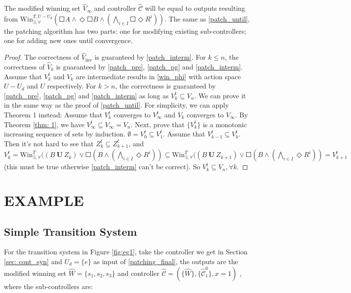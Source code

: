 The modified winning set $ \widehat{V}_{\infty} $ and controller $ \widehat{\mathcal{C}} $ will be equal to outputs resulting from $ \text{Win}_{\exists, \forall}^{T,U-U_d}\left(\Square A \wedge \Diamond \Square B \wedge \left( \bigwedge_{i\in I} \Square \Diamond R^i\right)\right) $. The same as \eqref{patch_until}, the patching algorithm has two parts: one for modifying existing sub-controllers; one for adding new ones until convergence.

\begin{proof}
	The correctness of $ \widehat{V}_{\text{inv}} $ is guaranteed by \eqref{patch_interm}.
	For $ k\leq n $, the correctness of $ \widehat{V}_{k} $ is guaranteed by \eqref{patch_pre}, \eqref{patch_pg} and \eqref{patch_interm}. Assume that $ V^t_k $ and $ V_k $ are intermediate results in \eqref{win_phi} with action space $ U-U_d $ and $ U $ respectively. For $ k > n$, the correctness is guaranteed by  \eqref{patch_pre}, \eqref{patch_pg} and \eqref{patch_interm} as long as $ V^t_{k} \subseteq V_n $. We can prove it in the same way as the proof of \eqref{patch_until}. For simplicity, we can apply Theorem 1 instead:  Assume that $ V_k^t $ converges to $ V_{\infty}^t $ and $ V_k $ converges to $ V_{\infty} $. By Theorem \ref{thm: 1}, we have $ V^t_{\infty}\subseteq V_{\infty} = V_n $. Next, prove that $ \{V^t_k\} $ is a monotonic increasing sequence of sets by induction. $ \emptyset = V^t_0 \subseteq V^t_1 $. Assume that $ V^t_{k-1}\subseteq V^t_{k}$. Then it's not hard to see that $ Z^t_k \subseteq Z^t_{k+1} $, and $ V^t_k = \text{Win}_{\exists,\forall}^{T} ((B \mathbf{\ U\ }Z_{k}) \vee \Square (B\wedge ( \bigwedge_{i\in I}\Diamond R^i))\subseteq \text{Win}_{\exists,\forall}^{T} ((B \mathbf{\ U\ }Z_{k+1}) \vee \Square (B\wedge ( \bigwedge_{i\in I}\Diamond R^i))=V^t_{k+1} $ (this must be true otherwise \eqref{patch_interm} can't be correct). So $ V^t_k \subseteq V_n, \forall k $. 
	
\end{proof}


\section{EXAMPLE}
\label{sec:example}
\subsection{Simple Transition System}
For the transition system in Figure \ref{fig:eg1}, take the controller we get in Section \ref{sec: cont_syn} and  $ U_d= \{e\} $ as input of \eqref{patching_final}, the outputs are the modified winning set $ \widehat{W}=\{s_1,s_2,s_3\} $ and controller $ \widehat{\mathcal{C}} = (\{\widehat{W}\},\{\widehat{\mathcal{C}}_1^0\},x=1) $ , where the sub-controllers are: 

